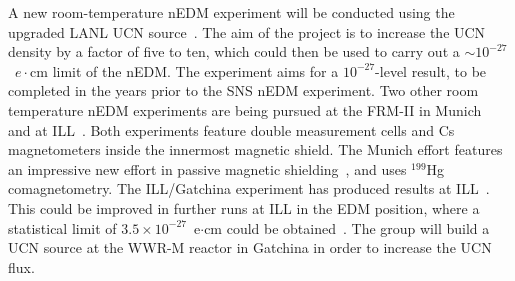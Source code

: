 A new room-temperature nEDM experiment will be conducted using the
upgraded LANL UCN source~\cite{Steven_talk}. The aim of the project is
to increase the UCN density by a factor of five to ten, which could
then be used to carry out a $\sim 10^{-27}$~$e\cdot$cm limit of the
nEDM.  The experiment aims for a $10^{-27}$-level result, to be
completed in the years prior to the SNS nEDM experiment. Two other
room temperature nEDM experiments are being pursued at the FRM-II in
Munich~\cite{altarev2012} and at ILL~\cite{Serebrov2015}. Both
experiments feature double measurement cells and Cs magnetometers
inside the innermost magnetic shield. The Munich effort features an
impressive new effort in passive magnetic
shielding~\cite{altarev2014magnetically,
  altarev2015large,altarev2015minimizing,altarev2012next}, and uses
$^{199}$Hg comagnetometry. The ILL/Gatchina experiment has produced
results at ILL~\cite{Serebrov2015}. This could be improved in further
runs at ILL in the EDM position, where a statistical limit of
$3.5 \times 10^{-27}$~e$\cdot$cm could be
obtained~\cite{Serebrov_talk}. The group will build a UCN source at
the WWR-M reactor in Gatchina in order to increase the UCN flux.




 

